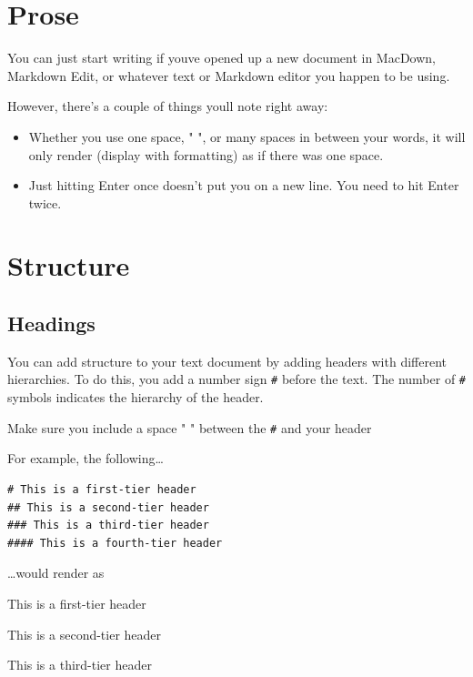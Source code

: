 \documentclass[
]{book}
\providecommand{\tightlist}{%
  \setlength{\itemsep}{0pt}\setlength{\parskip}{0pt}}
\begin{document}
\section{Prose}\label{prose}

You can just start writing if you\textquotesingle ve opened up a new document in MacDown, Markdown Edit, or whatever text or Markdown editor you happen to be using.

However, there's a couple of things you\textquotesingle ll note right away:

\begin{itemize}
\tightlist
\item
  Whether you use one space, " ", or many spaces in between your words, it will only render (display with formatting) as if there was one space.
\item
  Just hitting \textquotesingle Enter\textquotesingle{} once doesn't put you on a new line. You need to hit \textquotesingle Enter\textquotesingle{} twice.
\end{itemize}

\section{Structure}\label{structure-1}

\subsection*{Headings}\label{headings}

You can add structure to your text document by adding headers with different hierarchies. To do this, you add a number sign \texttt{\#} before the text. The number of \texttt{\#} symbols indicates the hierarchy of the header.

Make sure you include a space " " between the \texttt{\#} and your header

For example, the following\ldots{}

\begin{verbatim}
# This is a first-tier header
## This is a second-tier header
### This is a third-tier header
#### This is a fourth-tier header
\end{verbatim}

\ldots would render as

This is a first-tier header

This is a second-tier header

This is a third-tier header
\end{document}
